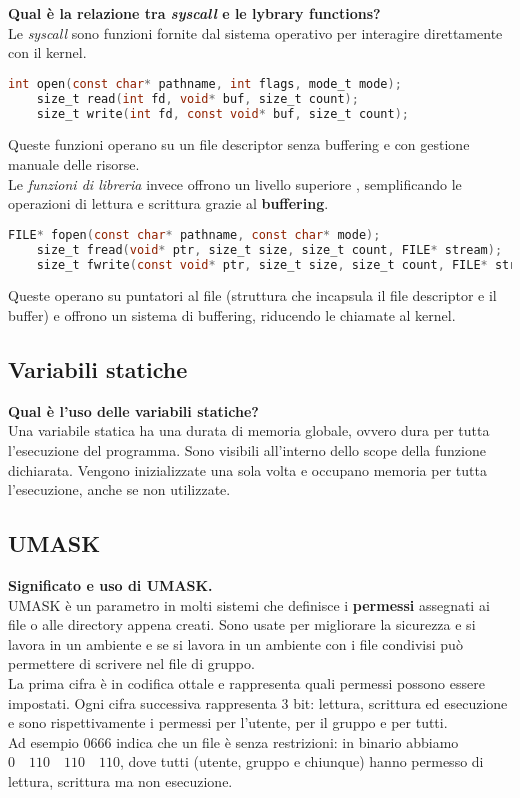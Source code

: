 \textbf{Qual è la relazione tra \textit{syscall} e le lybrary functions?}\\
Le \textit{syscall} sono funzioni fornite dal sistema operativo per interagire direttamente con il kernel.
\begin{lstlisting}[language=C]
	int open(const char* pathname, int flags, mode_t mode);
	size_t read(int fd, void* buf, size_t count);
	size_t write(int fd, const void* buf, size_t count);
\end{lstlisting}
Queste funzioni operano su un file descriptor senza buffering e con gestione manuale delle risorse.\\
Le \textit{funzioni di libreria} invece offrono un livello superiore , semplificando le operazioni di lettura e scrittura grazie al \textbf{buffering}.
\begin{lstlisting}[language=C]
	FILE* fopen(const char* pathname, const char* mode);
	size_t fread(void* ptr, size_t size, size_t count, FILE* stream);
	size_t fwrite(const void* ptr, size_t size, size_t count, FILE* stream);
\end{lstlisting}
Queste operano su puntatori al file (struttura che incapsula il file descriptor e il buffer) e offrono un sistema di buffering, riducendo le chiamate al kernel.

\subsection{Variabili statiche}
\textbf{Qual è l'uso delle variabili statiche?}\\
Una variabile statica ha una durata di memoria globale, ovvero dura per tutta l'esecuzione del programma. Sono visibili all'interno dello scope della funzione dichiarata. Vengono inizializzate una sola volta e occupano memoria per tutta l'esecuzione, anche se non utilizzate.

\subsection{UMASK}
\textbf{Significato e uso di UMASK.}\\
UMASK è un parametro in molti sistemi che definisce i \textbf{permessi} assegnati ai file o alle directory appena creati. Sono usate per migliorare la sicurezza e si lavora in un ambiente e se si lavora in un ambiente con i file condivisi può permettere di scrivere nel file di gruppo.\\
La prima cifra è in codifica ottale e rappresenta quali permessi possono essere impostati. Ogni cifra successiva rappresenta $3$ bit: lettura, scrittura ed esecuzione e sono rispettivamente i permessi per l'utente, per il gruppo e per tutti.\\
Ad esempio $0666$ indica che un file è senza restrizioni: in binario abbiamo $0 \quad 110 \quad 110 \quad 110$, dove tutti (utente, gruppo e chiunque) hanno permesso di lettura, scrittura ma non esecuzione.

